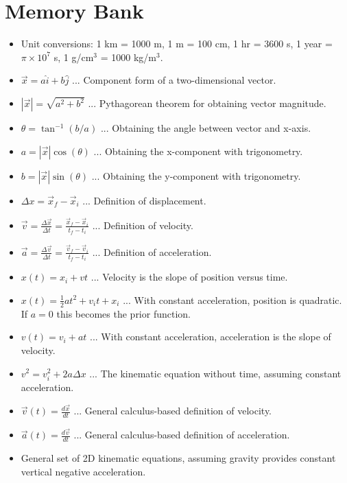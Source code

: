 \documentclass[10pt]{article}
\begin{document}
\maketitle

\section{Memory Bank}

\begin{itemize}
\item Unit conversions: 1 km = 1000 m, 1 m = 100 cm, 1 hr = 3600 s, 1 year = $\pi \times 10^7$ s, 1 g/cm$^3$ = 1000 kg/m$^3$.
\item $\vec{x} = a \hat{i} + b\hat{j}$ ... Component form of a two-dimensional vector.
\item $|\vec{x}| = \sqrt{a^2+b^2}$ ... Pythagorean theorem for obtaining vector magnitude.
\item $\theta = \tan^{-1}(b/a)$ ... Obtaining the angle between vector and x-axis.
\item $a = |\vec{x}|\cos(\theta)$ ... Obtaining the x-component with trigonometry.
\item $b = |\vec{x}|\sin(\theta)$ ... Obtaining the y-component with trigonometry.
\item $\Delta x = \vec{x}_f - \vec{x}_i$ ... Definition of displacement.
\item $\vec{v} = \frac{\Delta \vec{x}}{\Delta t} = \frac{\vec{x}_f - \vec{x}_i}{t_f-t_i}$ ... Definition of velocity.
\item $\vec{a} = \frac{\Delta \vec{v}}{\Delta t} = \frac{\vec{v}_f - \vec{v}_i}{t_f-t_i}$ ... Definition of acceleration.
\item $x(t) = x_i + v t$ ... Velocity is the slope of position versus time.
\item $x(t) = \frac{1}{2} a t^2 + v_i t + x_i$ ... With constant acceleration, position is quadratic.  If $a=0$ this becomes the prior function.
\item $v(t) = v_i + a t$ ... With constant acceleration, acceleration is the slope of velocity.
\item $v^2 = v_i^2 + 2 a \Delta x$ ... The kinematic equation without time, assuming constant acceleration.
\item $\vec{v}(t) = \frac{d\vec{x}}{dt}$ ... General calculus-based definition of velocity.
\item $\vec{a}(t) = \frac{d\vec{v}}{dt}$ ... General calculus-based definition of acceleration.
\item General set of 2D kinematic equations, assuming gravity provides constant vertical negative acceleration.

\end{itemize}
\end{document}
